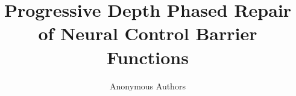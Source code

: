 \documentclass{article}
\title{Progressive Depth Phased Repair of Neural Control Barrier Functions}
\author{Anonymous Authors}
\theoremstyle{plain}
\theoremstyle{definition}
\theoremstyle{remark}
\begin{document}
\maketitle

\begin{abstract}

\end{abstract}










\newpage
\appendix

\end{document}

